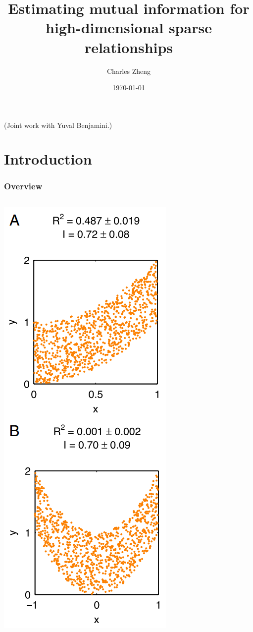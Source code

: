 \documentclass{beamer}
\title[Mutual information]{Estimating mutual information for high-dimensional sparse relationships}
\author{Charles Zheng} %
\institute[Stanford] %
{Stanford University}
\date{\today} %
\begin{document}
\begin{frame}
\titlepage %
(Joint work with Yuval Benjamini.)
\end{frame}


\section{Introduction}

\begin{frame}
\frametitle{Overview}
\begin{columns}
\begin{column}{0.25\textwidth}
\includegraphics[scale = 0.27]{kinney3.png}

\end{column}
\end{columns}
\end{frame}
\end{document}
